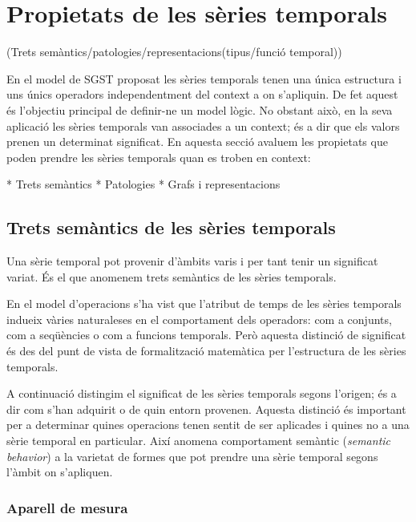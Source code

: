 \section{Propietats de les sèries temporals}

\todo{}
 (Trets semàntics/patologies/representacions(tipus/funció temporal))


En el model de SGST proposat les sèries temporals tenen una única estructura i uns únics operadors independentment del context a on s'apliquin. De fet aquest és l'objectiu principal de definir-ne un model lògic. No obstant això, en la seva aplicació les sèries temporals van associades a un context; és a dir que els valors prenen un determinat significat. En aquesta secció avaluem les propietats que poden prendre les sèries temporals quan es troben en context:

* Trets semàntics
* Patologies
* Grafs i representacions




\subsection{Trets semàntics de les sèries temporals}

Una sèrie temporal pot provenir d'àmbits varis i per tant tenir un
significat variat. És el que anomenem trets semàntics de les sèries
temporals.


En el model d'operacions s'ha vist que l'atribut de temps de les
sèries temporals indueix vàries naturaleses en el comportament dels
operadors: com a conjunts, com a seqüències o com a funcions
temporals. Però aquesta distinció de significat és des del punt de
vista de formalització matemàtica per l'estructura de les sèries
temporals.

A continuació distingim el significat de les sèries temporals segons
l'origen; és a dir com s'han adquirit o de quin entorn
provenen. Aquesta distinció és important per a determinar quines
operacions tenen sentit de ser aplicades i quines no a una sèrie
temporal en particular. Així \textcite{segev87:sigmod} anomena
comportament semàntic (\emph{semantic behavior}) a la varietat de
formes que pot prendre una sèrie temporal segons l'àmbit on
s'apliquen.


\subsubsection{Aparell de mesura}


